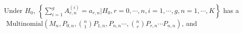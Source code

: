 \documentclass[12pt,oneside]{report}
\theoremstyle{definition}
\theoremstyle{mystyle}
\begin{document}



Under $H_{0}$, $\left\{\sum\limits_{i=1}^{g}A_{r,n}^{(i)}=a_{r,n}|H_{0},r=0,\cdots,n,i=1,\cdots,g,n=1,\cdots,K\right\} $ has a $\text{ Multinomial} \left(M_{n},P_{0,n},\binom{n}{1}P_{1,n},P_{n,n}\cdots,\binom{n}{r}P_{r,n}\cdots P_{n,n} \right)$, and



\end{document}
